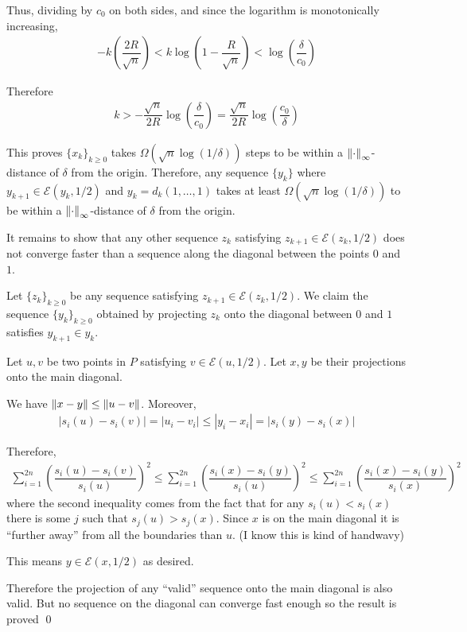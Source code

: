 \documentclass[10pt]{article}
\begin{document}
\begin{solution}
Thus, dividing by \( c_0 \) on both sides, and since the logarithm is monotonically increasing, 
\begin{align*}
    - k \left( \dfrac{2R}{\sqrt{n}} \right) < k \log \left( 1- \dfrac{R}{\sqrt{n}} \right) < \log \left( \dfrac{\delta}{c_0} \right)
\end{align*}

Therefore
\begin{align*}
    k > - \dfrac{\sqrt{n}}{2R} \log \left( \dfrac{\delta}{c_0} \right) = \dfrac{\sqrt{n}}{2R} \log \left( \dfrac{c_0}{\delta} \right)
\end{align*}

This proves \( \{x_k\}_{k\geq 0} \) takes \( \Omega(\sqrt{n}\log(1/\delta)) \) steps to be within a \( \left\lVert\cdot\right\rVert_\infty \)-distance of \( \delta \) from the origin.
Therefore, any sequence \( \{y_k\} \) where \( y_{k+1}\in \mathcal{E} (y_k,1/2) \) and \( y_k = d_k(1,\ldots, 1) \) takes at least \( \Omega(\sqrt{n}\log(1/\delta)) \) to be within a \( \left\lVert\cdot\right\rVert_\infty \)-distance of \( \delta \) from the origin.

It remains to show that any other sequence \( z_k \) satisfying \( z_{k+1}\in \mathcal{E}(z_k,1/2) \) does not converge faster than a sequence along the diagonal between the points \( 0 \) and \( 1 \).

Let \( \{z_k\}_{k\geq 0} \) be any sequence satisfying \( z_{k+1}\in \mathcal{E}(z_k,1/2) \). We claim the sequence \( \{ y_k \}_{k\geq 0} \) obtained by projecting \( z_k \) onto the diagonal between \( 0 \) and \( 1 \) satisfies \( y_{k+1}\in y_k \).

Let \( u,v \) be two points in \( P \) satisfying \( v\in \mathcal{E} (u,1/2) \). Let \( x,y \) be their projections onto the main diagonal.

We have \( \left\lVert x-y\right\rVert\leq \left\lVert u-v\right\rVert \). Moreover,
\begin{align*}
    |s_i(u)-s_i(v)| = |u_i - v_i| \leq |y_i - x_i| = |s_i(y)-s_i(x)|
\end{align*}

Therefore,
\begin{align*}
    \sum_{i=1}^{2n} \left( \dfrac{s_i(u)-s_i(v)}{s_i(u)} \right)^2 
    \leq \sum_{i=1}^{2n} \left( \dfrac{s_i(x)-s_i(y)}{s_i(u)} \right)^2 
    \leq \sum_{i=1}^{2n} \left( \dfrac{s_i(x)-s_i(y)}{s_i(x)} \right)^2 
\end{align*}
where the second inequality comes from the fact that for any \( s_i(u) < s_i(x) \) there is some \( j \) such that \( s_j(u) > s_j(x) \). Since \( x \) is on the main diagonal it is ``further away'' from all the boundaries than \( u \). (I know this is kind of handwavy)

This means \( y \in \mathcal{E} (x,1/2) \) as desired.

Therefore the projection of any ``valid'' sequence onto the main diagonal is also valid. But no sequence on the diagonal can converge fast enough so the result is proved
\qed


\end{solution}
\end{document}

